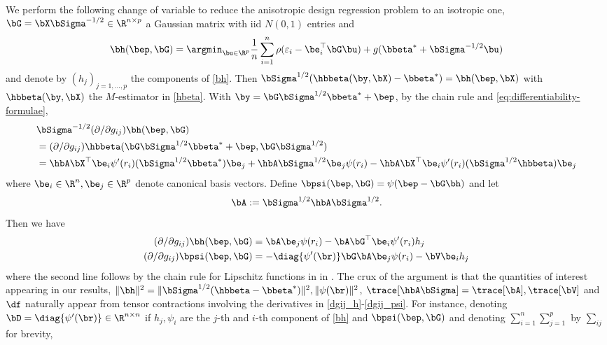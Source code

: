 \documentclass{colt2022} %
\def\eps{\varepsilon}
\numberwithin{equation}{section}
\begin{document}
We perform the following change of variable
to reduce the anisotropic design regression problem to an isotropic one,
$\bG = \bX\bSigma^{-1/2}\in\R^{n\times p}$
a Gaussian matrix with iid $N(0,1)$ entries and
\begin{equation}
\bh(\bep,\bG) = \argmin_{\bu\in\R^p}
\frac1n\sum_{i=1}^n\rho(\eps_i - \be_i^\top\bG\bu) + g(\bbeta^* + \bSigma^{-1/2}\bu)
\label{bh}    
\end{equation}
and denote by $(h_j)_{j=1,...,p}$ the components of \eqref{bh}.
Then $\bSigma^{1/2}(\hbbeta(\by,\bX)-\bbeta^*) = \bh(\bep,\bX)$
with $\hbbeta(\by,\bX)$ the $M$-estimator in \eqref{hbeta}.
With $\by=\bG\bSigma^{1/2}\bbeta^* + \bep$,
by the chain rule and \eqref{eq:differentiability-formulae},
\begin{align*}
    &\bSigma^{-1/2}(\partial/\partial g_{ij})\bh(\bep,\bG)
\\&= (\partial/\partial g_{ij}) \hbbeta(\bG\bSigma^{1/2}\bbeta^* + \bep,\bG\bSigma^{1/2})
\\&=
\hbA\bX^\top\be_i \psi'(r_i)(\bSigma^{1/2}\bbeta^*)\be_j
+ \hbA\bSigma^{1/2}\be_j \psi(r_i)
- \hbA\bX^\top\be_i \psi'(r_i)(\bSigma^{1/2}\hbbeta)\be_j
\end{align*}
where $\be_i\in\R^n,\be_j\in\R^p$ denote canonical
basis vectors. 
Define $\bpsi(\bep,\bG) = \psi(\bep - \bG\bh)$ and let
$$\bA := \bSigma^{1/2}\hbA\bSigma^{1/2}.$$
Then we have
\begin{align}
(\partial/\partial g_{ij})\bh(\bep,\bG)
&= \bA\be_j \psi(r_i) 
- \bA\bG^\top \be_i \psi'(r_i) h_j
\label{dgij_h}
\\
(\partial/\partial g_{ij})\bpsi(\bep,\bG)
    &= - \diag\{\psi'(\br)\} \bG\bA\be_j \psi(r_i)
- \bV\be_i h_j
\label{dgij_psi}
\end{align}
where the second line follows by the chain rule
for Lipschitz functions in 
in \cite[Theorem 2.1.11]{ziemer2012weakly}.
The crux of the argument is that the
quantities of interest appearing in our results,
$\|\bh\|^2=\|\bSigma^{1/2}(\hbbeta-\bbeta^*)\|^2,
\|\psi(\br)\|^2$,
$\trace[\hbA\bSigma]=\trace[\bA],\trace[\bV]$ and $\df$
naturally appear from tensor contractions involving the derivatives
in \eqref{dgij_h}-\eqref{dgij_psi}. For instance, denoting
$\bD=\diag\{\psi'(\br)\}\in\R^{n\times n}$ if $h_j,\psi_i$
are the $j$-th and $i$-th component of \eqref{bh}
and $\bpsi(\bep,\bG)$
and denoting $\sum_{i=1}^n\sum_{j=1}^p$ by $\sum_{ij}$ for brevity,
\end{document}
